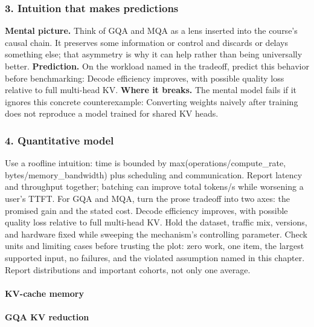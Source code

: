 \subsubsection*{3. Intuition that makes predictions}
\textbf{Mental picture.} Think of GQA and MQA as a lens inserted into the course's causal chain. It preserves some information or control and discards or delays something else; that asymmetry is why it can help rather than being universally better.
\textbf{Prediction.} On the workload named in the tradeoff, predict this behavior before benchmarking: Decode efficiency improves, with possible quality loss relative to full multi-head KV.
\textbf{Where it breaks.} The mental model fails if it ignores this concrete counterexample: Converting weights naively after training does not reproduce a model trained for shared KV heads.
\subsubsection*{4. Quantitative model}
Use a roofline intuition: time is bounded by max(operations/compute\_rate, bytes/memory\_bandwidth) plus scheduling and communication. Report latency and throughput together; batching can improve total tokens/s while worsening a user's TTFT.
For GQA and MQA, turn the prose tradeoff into two axes: the promised gain and the stated cost. Decode efficiency improves, with possible quality loss relative to full multi-head KV. Hold the dataset, traffic mix, versions, and hardware fixed while sweeping the mechanism's controlling parameter.
Check units and limiting cases before trusting the plot: zero work, one item, the largest supported input, no failures, and the violated assumption named in this chapter. Report distributions and important cohorts, not only one average.
\paragraph{KV-cache memory}
\paragraph{GQA KV reduction}
